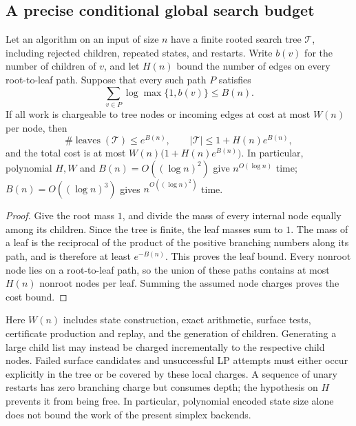 \subsection{A precise conditional global search budget}
\label{sec:conditional-global-budget}

\begin{theorem}
\label{thm:search-tree-budget}
Let an algorithm on an input of size $n$ have a finite rooted search tree
$\mathcal T$, including rejected children, repeated states, and restarts.
Write $b(v)$ for the number of children of $v$, and let $H(n)$ bound the
number of edges on every root-to-leaf path.  Suppose that every such path
$P$ satisfies
\[
 \sum_{v\in P}\log\max\{1,b(v)\}\leq B(n).
\]
If all work is chargeable to tree nodes or incoming edges at cost at most
$W(n)$ per node, then
\[
 \#\operatorname{leaves}(\mathcal T)\leq e^{B(n)},\qquad
 |\mathcal T|\leq 1+H(n)e^{B(n)},
\]
and the total cost is at most
$W(n)\bigl(1+H(n)e^{B(n)}\bigr)$.
In particular, polynomial $H,W$ and $B(n)=O((\log n)^2)$ give
$n^{O(\log n)}$ time; $B(n)=O((\log n)^3)$ gives
$n^{O((\log n)^2)}$ time.
\end{theorem}

\begin{proof}
Give the root mass $1$, and divide the mass of every internal node equally
among its children.  Since the tree is finite, the leaf masses sum to $1$.
The mass of a leaf is the reciprocal of the product of the positive
branching numbers along its path, and is therefore at least $e^{-B(n)}$.
This proves the leaf bound.  Every nonroot node lies on a root-to-leaf
path, so the union of these paths contains at most $H(n)$ nonroot nodes
per leaf.  Summing the assumed node charges proves the cost bound.
\end{proof}

Here $W(n)$ includes state construction, exact arithmetic, surface tests,
certificate production and replay, and the generation of children.
Generating a large child list may instead be charged incrementally to
the respective child nodes.  Failed surface candidates and unsuccessful
LP attempts must either occur explicitly in the tree or be covered by
these local charges.  A sequence of unary restarts has zero branching
charge but consumes depth; the hypothesis on $H$ prevents it from being
free.  In particular, polynomial encoded state size alone does not bound
the work of the present simplex backends.

